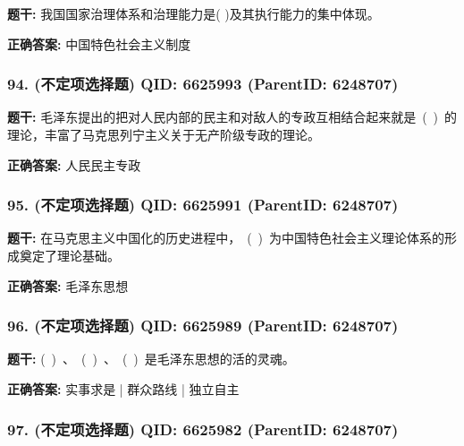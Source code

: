 \documentclass[12pt,UTF8]{ctexart}
\begin{document}
\textbf{题干:}
我国国家治理体系和治理能力是(  )及其执行能力的集中体现。



\textbf{正确答案:}
中国特色社会主义制度

\vspace{0.3em}\hrulefill\vspace{0.7em}

\subsubsection*{94. (不定项选择题) \small QID: 6625993 (ParentID: 6248707)}

\textbf{题干:}
毛泽东提出的把对人民内部的民主和对敌人的专政互相结合起来就是 ( ) 的理论，丰富了马克思列宁主义关于无产阶级专政的理论。



\textbf{正确答案:}
人民民主专政

\vspace{0.3em}\hrulefill\vspace{0.7em}

\subsubsection*{95. (不定项选择题) \small QID: 6625991 (ParentID: 6248707)}

\textbf{题干:}
在马克思主义中国化的历史进程中， ( ) 为中国特色社会主义理论体系的形成奠定了理论基础。



\textbf{正确答案:}
毛泽东思想

\vspace{0.3em}\hrulefill\vspace{0.7em}

\subsubsection*{96. (不定项选择题) \small QID: 6625989 (ParentID: 6248707)}

\textbf{题干:}
( ) 、 ( ) 、 ( ) 是毛泽东思想的活的灵魂。



\textbf{正确答案:}
实事求是 | 群众路线 | 独立自主

\vspace{0.3em}\hrulefill\vspace{0.7em}

\subsubsection*{97. (不定项选择题) \small QID: 6625982 (ParentID: 6248707)}
\end{document}
